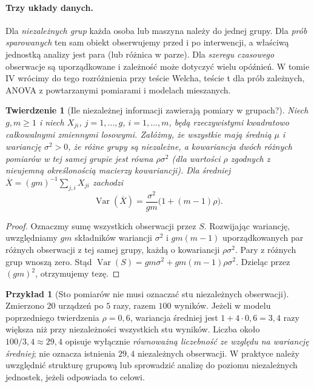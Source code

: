 \documentclass[11pt,a4paper,oneside]{report}
\numberwithin{equation}{chapter}
\theoremstyle{plain}
\newtheorem{twierdzenie}{Twierdzenie}[chapter]
\theoremstyle{definition}
\newtheorem{przyklad}{Przykład}[chapter]
\theoremstyle{remark}
\newcommand{\Var}{\operatorname{Var}}
\begin{document}
\paragraph{Trzy układy danych.}
Dla \emph{niezależnych grup} każda osoba lub maszyna należy do jednej grupy. Dla \emph{prób sparowanych} ten sam obiekt obserwujemy przed i po interwencji, a właściwą jednostką analizy jest para (lub różnica w parze). Dla \emph{szeregu czasowego} obserwacje są uporządkowane i zależność może dotyczyć wielu opóźnień. W tomie IV wrócimy do tego rozróżnienia przy teście Welcha, teście t dla prób zależnych, ANOVA z powtarzanymi pomiarami i modelach mieszanych.


\begin{twierdzenie}[Ile niezależnej informacji zawierają pomiary w grupach?]\label{thm:cluster-design}
Niech $g,m\ge1$ i niech $X_{ji}$, $j=1,\ldots,g$, $i=1,\ldots,m$,
będą rzeczywistymi kwadratowo całkowalnymi zmiennymi losowymi.
Załóżmy, że wszystkie mają średnią $\mu$ i wariancję $\sigma^2>0$,
że różne grupy są niezależne, a kowariancja dwóch różnych pomiarów
w tej samej grupie jest równa $\rho\sigma^2$ (dla wartości $\rho$
zgodnych z nieujemną określonością macierzy kowariancji).
Dla średniej $\overline X=(gm)^{-1}\sum_{j,i}X_{ji}$ zachodzi
\[
\Var(\overline X)=\frac{\sigma^2}{gm}\bigl(1+(m-1)\rho\bigr).
\]
\end{twierdzenie}
\begin{proof}
Oznaczmy sumę wszystkich obserwacji przez $S$. Rozwijając wariancję,
uwzględniamy $gm$ składników wariancji $\sigma^2$ i
$gm(m-1)$ uporządkowanych par różnych obserwacji z tej samej grupy,
każdą o kowariancji $\rho\sigma^2$. Pary z różnych grup wnoszą zero.
Stąd $\Var(S)=gm\sigma^2+gm(m-1)\rho\sigma^2$.
Dzieląc przez $(gm)^2$, otrzymujemy tezę.
\end{proof}
\begin{przyklad}[Sto pomiarów nie musi oznaczać stu niezależnych obserwacji]
Zmierzono $20$ urządzeń po $5$ razy, razem $100$ wyników.
Jeżeli w modelu poprzedniego twierdzenia $\rho=0{,}6$, wariancja
średniej jest $1+4\cdot0{,}6=3{,}4$ razy większa niż przy
niezależności wszystkich stu wyników. Liczba około $100/3{,}4\approx29{,}4$
opisuje wyłącznie \emph{równoważną liczebność ze względu na wariancję
średniej}; nie oznacza istnienia $29{,}4$ niezależnych obserwacji.
W praktyce należy uwzględnić strukturę grupową lub sprowadzić
analizę do poziomu niezależnych jednostek, jeżeli odpowiada to celowi.
\end{przyklad}
\end{document}
